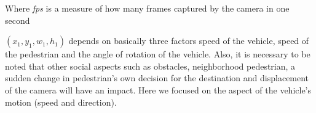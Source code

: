 Where \textit{fps} is a measure of how many frames captured by the camera in one second

$(x_1,y_1,w_1,h_1)$ depends on basically three factors speed of the vehicle, speed of the pedestrian and the angle of rotation of the vehicle. Also, it is necessary to be noted that other social aspects such as obstacles, neighborhood pedestrian, a sudden change in pedestrian's own decision for the destination and displacement of the camera will have an impact.
Here we focused on the aspect of the vehicle's motion (speed and direction).










